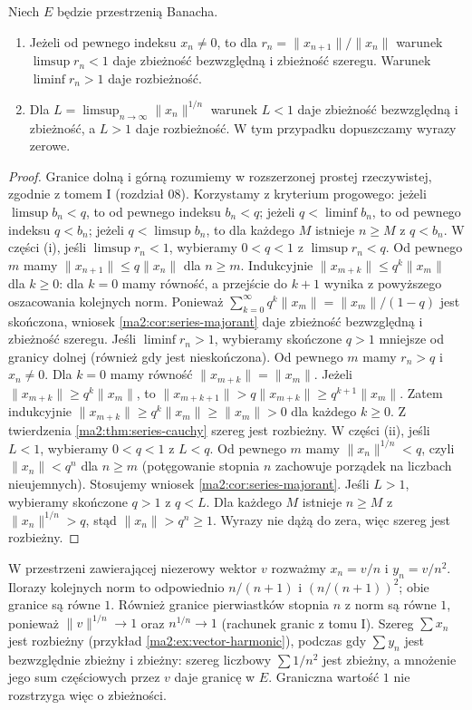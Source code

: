 \begin{twierdzenie}
\label{ma2:thm:vector-ratio-root}
Niech $E$ będzie przestrzenią Banacha.
\begin{enumerate}[label=(\roman*)]
\item Jeżeli od pewnego indeksu $x_n\ne0$, to dla
$r_n=\|x_{n+1}\|/\|x_n\|$ warunek $\limsup r_n<1$
daje zbieżność bezwzględną i zbieżność szeregu.
Warunek $\liminf r_n>1$ daje rozbieżność.
\item Dla $L=\limsup_{n\to\infty}\|x_n\|^{1/n}$
warunek $L<1$ daje zbieżność bezwzględną i zbieżność,
a $L>1$ daje rozbieżność. W tym przypadku dopuszczamy
wyrazy zerowe.
\end{enumerate}
\end{twierdzenie}
\begin{proof}
Granice dolną i górną rozumiemy w rozszerzonej prostej
rzeczywistej, zgodnie z tomem I (rozdział 08). Korzystamy
z kryterium progowego: jeżeli $\limsup b_n<q$, to od
pewnego indeksu $b_n<q$; jeżeli $q<\liminf b_n$, to od
pewnego indeksu $q<b_n$; jeżeli $q<\limsup b_n$, to
dla każdego $M$ istnieje $n\ge M$ z $q<b_n$.
W części (i), jeśli $\limsup r_n<1$, wybieramy
$0<q<1$ z $\limsup r_n<q$. Od pewnego $m$ mamy
$\|x_{n+1}\|\le q\|x_n\|$ dla $n\ge m$.
Indukcyjnie $\|x_{m+k}\|\le q^k\|x_m\|$ dla $k\ge0$:
dla $k=0$ mamy równość, a przejście do $k+1$ wynika
z powyższego oszacowania kolejnych norm.
Ponieważ $\sum_{k=0}^\infty q^k\|x_m\|=\|x_m\|/(1-q)$
jest skończona, wniosek \ref{ma2:cor:series-majorant}
daje zbieżność bezwzględną i zbieżność szeregu.
Jeśli $\liminf r_n>1$, wybieramy skończone $q>1$ mniejsze
od granicy dolnej (również gdy jest nieskończona).
Od pewnego $m$ mamy $r_n>q$ i $x_n\ne0$.
Dla $k=0$ mamy równość $\|x_{m+k}\|=\|x_m\|$.
Jeżeli $\|x_{m+k}\|\ge q^k\|x_m\|$, to
$\|x_{m+k+1}\|>q\|x_{m+k}\|\ge q^{k+1}\|x_m\|$.
Zatem indukcyjnie $\|x_{m+k}\|\ge q^k\|x_m\|\ge\|x_m\|>0$
dla każdego $k\ge0$. Z twierdzenia \ref{ma2:thm:series-cauchy}
szereg jest rozbieżny.
W części (ii), jeśli $L<1$, wybieramy $0<q<1$ z $L<q$.
Od pewnego $m$ mamy $\|x_n\|^{1/n}<q$, czyli
$\|x_n\|<q^n$ dla $n\ge m$ (potęgowanie stopnia $n$ zachowuje
porządek na liczbach nieujemnych).
Stosujemy wniosek \ref{ma2:cor:series-majorant}.
Jeśli $L>1$, wybieramy skończone $q>1$ z $q<L$.
Dla każdego $M$ istnieje $n\ge M$ z $\|x_n\|^{1/n}>q$,
stąd $\|x_n\|>q^n\ge1$. Wyrazy nie dążą do zera,
więc szereg jest rozbieżny.
\end{proof}
\begin{przyklad}
\label{ma2:ex:ratio-root-boundary}
W przestrzeni zawierającej niezerowy wektor $v$ rozważmy
$x_n=v/n$ i $y_n=v/n^2$. Ilorazy kolejnych norm to
odpowiednio $n/(n+1)$ i $(n/(n+1))^2$; obie granice są równe
$1$. Również granice pierwiastków stopnia $n$ z norm są równe
$1$, ponieważ $\|v\|^{1/n}\to1$ oraz $n^{1/n}\to1$
(rachunek granic z tomu I). Szereg $\sum x_n$ jest rozbieżny
(przykład \ref{ma2:ex:vector-harmonic}), podczas gdy
$\sum y_n$ jest bezwzględnie zbieżny i zbieżny: szereg
liczbowy $\sum 1/n^2$ jest zbieżny, a mnożenie jego sum
częściowych przez $v$ daje granicę w $E$. Graniczna wartość
$1$ nie rozstrzyga więc o zbieżności.
\end{przyklad}

